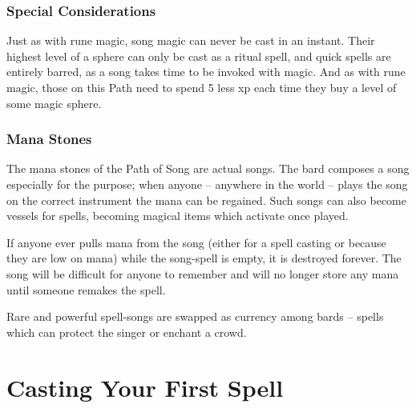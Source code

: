 \begin{multicols}{2}
\subsubsection{Special Considerations}

Just as with rune magic, song magic can never be cast in an instant.  Their highest level of a sphere can only be cast as a ritual spell, and quick spells are entirely barred, as a song takes time to be invoked with magic.  And as with rune magic, those on this Path need to spend 5 less \gls{xp} each time they buy a level of some magic sphere.

\subsubsection{Mana Stones}

The mana stones of the Path of Song are actual songs. The bard composes a song especially for the purpose; when anyone -- anywhere in the world -- plays the song on the correct instrument the mana can be regained. Such songs can also become vessels for spells, becoming magical items which activate once played.

If anyone ever pulls mana from the song (either for a spell casting or because they are low on mana) while the song-spell is empty, it is destroyed forever. The song will be difficult for anyone to remember and will no longer store any mana until someone remakes the spell.

Rare and powerful spell-songs are swapped as currency among bards -- spells which can protect the singer or enchant a crowd.

\end{multicols}

\section[Spellcasting]{Casting Your First Spell}

